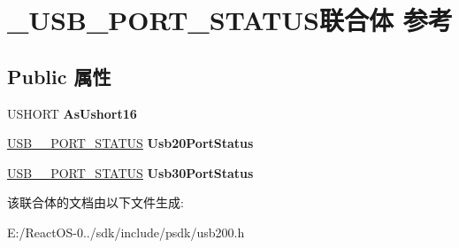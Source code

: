 \hypertarget{union___u_s_b___p_o_r_t___s_t_a_t_u_s}{}\section{\+\_\+\+U\+S\+B\+\_\+\+P\+O\+R\+T\+\_\+\+S\+T\+A\+T\+U\+S联合体 参考}
\label{union___u_s_b___p_o_r_t___s_t_a_t_u_s}
\subsection*{Public 属性}
\begin{DoxyCompactItemize}
\item 
\mbox{\label{union___u_s_b___p_o_r_t___s_t_a_t_u_s_af188ad079d454de9378aea9472be5ed0}} 
U\+S\+H\+O\+RT {\bfseries As\+Ushort16}
\item 
\mbox{\label{union___u_s_b___p_o_r_t___s_t_a_t_u_s_ae01d16371833f4154e11ac2c1b5aa4ab}} 
\hyperlink{union___u_s_b__20___p_o_r_t___s_t_a_t_u_s}{U\+S\+B\+\_\+\_\+\+P\+O\+R\+T\+\_\+\+S\+T\+A\+T\+US} {\bfseries Usb20\+Port\+Status}
\item 
\mbox{\label{union___u_s_b___p_o_r_t___s_t_a_t_u_s_a3b9e696d7049c6d12e71e3dcc2d422e1}} 
\hyperlink{union___u_s_b__30___p_o_r_t___s_t_a_t_u_s}{U\+S\+B\+\_\+\_\+\+P\+O\+R\+T\+\_\+\+S\+T\+A\+T\+US} {\bfseries Usb30\+Port\+Status}
\end{DoxyCompactItemize}


该联合体的文档由以下文件生成\+:\begin{DoxyCompactItemize}
\item 
E\+:/\+React\+O\+S-\/0../sdk/include/psdk/usb200.\+h\end{DoxyCompactItemize}
